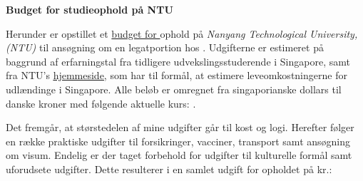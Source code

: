 \documentclass[../Ansoegning.tex]{subfiles}
\begin{document}
\vspace{-5ex}
\begin{center}
    \textbf{\LARGE{Budget for studieophold på NTU}}\vspace{-3ex}
\end{center}

Herunder er opstillet et \underline{budget for \Periodes} ophold på \textit{Nanyang Technological University, (NTU)} til ansøgning om en legatportion hos \textit{\FondNavn}. Udgifterne er estimeret på baggrund af erfarningstal fra tidligere udvekslingsstuderende i Singapore, samt fra NTU's \underline{\href{https://global.ntu.edu.sg/GMP/GEMTrailblazer/GEMTrailblazerexchange/Beforeyouapply/Pages/LivinginSingapore.aspx?fbclid=IwAR1wz42j8teW7sBJjKLteay74tG7sBoB6nE7yAiWv1teHnOvs5v-Vj8tjvA}{hjemmeside}}, som har til formål, at estimere leveomkostningerne for udlændinge i Singapore. Alle beløb er omregnet fra singaporianske dollars til danske kroner med følgende aktuelle kurs: \Kurs.

Det fremgår, at størstedelen af mine udgifter går til kost og logi. Herefter følger en række praktiske udgifter til forsikringer, vacciner, transport samt ansøgning om visum. Endelig er der taget forbehold for udgifter til kulturelle formål samt uforudsete udgifter. Dette resulterer i en samlet udgift for opholdet på \Udgift kr.:
\end{document}
